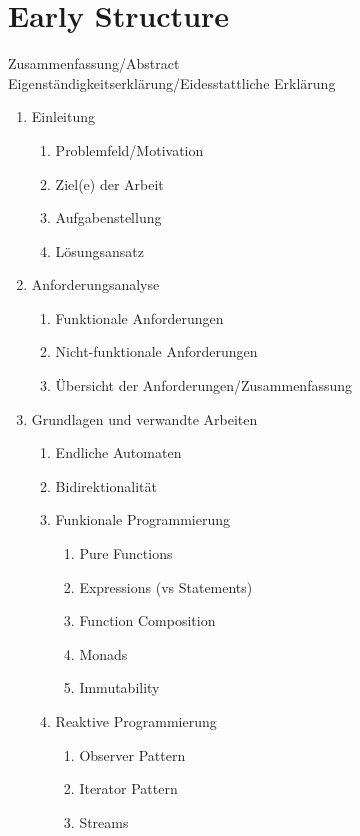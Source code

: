 \section{Early Structure}
\label{sec:early-structure}

\quad Zusammenfassung/Abstract \\
\quad Eigenständigkeitserklärung/Eidesstattliche Erklärung
\begin{enumerate}
    \item Einleitung
    \begin{enumerate}
        \item Problemfeld/Motivation
        \item Ziel(e) der Arbeit
        \item Aufgabenstellung
        \item Lösungsansatz
    \end{enumerate}
    \item Anforderungsanalyse
    \begin{enumerate}
        \item Funktionale Anforderungen
        \item Nicht-funktionale Anforderungen
        \item Übersicht der Anforderungen/Zusammenfassung
    \end{enumerate}
    \item Grundlagen und verwandte Arbeiten
    \begin{enumerate}
        \item Endliche Automaten
        \item Bidirektionalität
        \item Funkionale Programmierung
        \begin{enumerate}
            \item Pure Functions
            \item Expressions (vs Statements)
            \item Function Composition
            \item Monads
            \item Immutability
        \end{enumerate}
        \item Reaktive Programmierung
        \begin{enumerate}
            \item Observer Pattern
            \item Iterator Pattern
            \item Streams

\end{enumerate}
\end{enumerate}
\end{enumerate}
